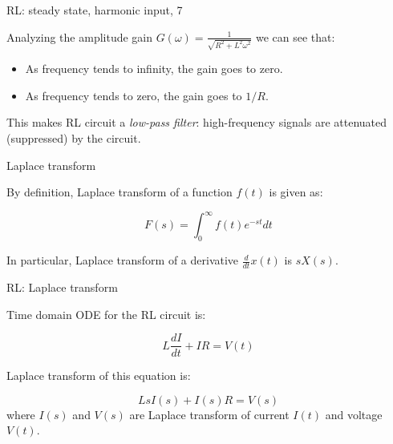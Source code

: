 \documentclass{beamer}
\begin{document}
\begin{frame}{RL: steady state, harmonic input, 7}
	\begin{flushleft}
		
		Analyzing the amplitude gain $G(\omega) = \frac{1}{\sqrt{R^2 + L^2 \omega^2}}$ we can see that:
		
		\bigskip
		
		\begin{itemize}
			\item As frequency tends to infinity, the gain goes to zero.
			
			\item As frequency tends to zero, the gain goes to $1/R$.
		\end{itemize}
	
		\bigskip
		
		This makes RL circuit a \emph{low-pass filter}: high-frequency signals are attenuated (suppressed) by the circuit.
		
	\end{flushleft}
\end{frame}


\begin{frame}{Laplace transform}
	\begin{flushleft}
		
		By definition, Laplace transform of a function $f(t)$ is given as:
		
		\begin{equation}
			F(s) = \int_0^\infty f(t) e^{-st}dt
		\end{equation}
		
		\bigskip
		
		In particular, Laplace transform of a derivative $\frac{d}{dt}x(t)$ is $s X(s)$.
		
	\end{flushleft}
\end{frame}




\begin{frame}{RL: Laplace transform}
	\begin{flushleft}
		
		Time domain ODE for the RL circuit is:
		
		\begin{equation}
			L \frac{dI}{dt} + IR = V(t)
		\end{equation}
		
		Laplace transform of this equation is:
		
		\begin{equation}
			Ls I(s) + I(s)R = V(s)
		\end{equation}
		where $I(s)$ and $V(s)$ are Laplace transform of current $I(t)$ and voltage $V(t)$.
	
	\end{flushleft}
\end{frame}
\end{document}
